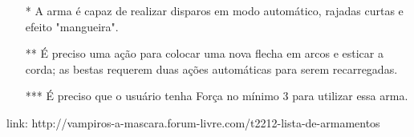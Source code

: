 \begin{itemize}[noitemsep]
\item[*] A arma é capaz de realizar disparos em modo automático, rajadas curtas e efeito "mangueira".

\item[**] É preciso uma ação para colocar uma nova flecha em arcos e esticar a corda; as bestas requerem duas ações automáticas para serem recarregadas.

\item[***] É preciso que o usuário tenha Força no mínimo 3 para utilizar essa arma.

\end{itemize}

link: http://vampiros-a-mascara.forum-livre.com/t2212-lista-de-armamentos